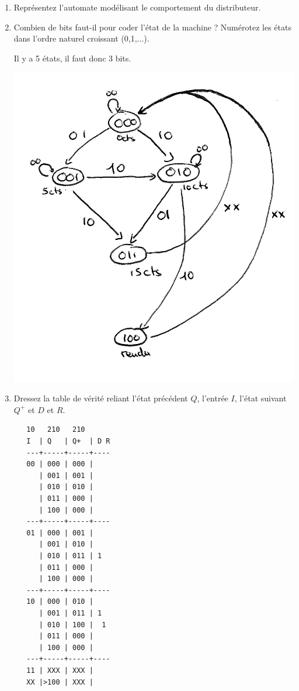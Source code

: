 \documentclass[a4paper,10pt]{exam}
\begin{document}
\begin{enumerate}
  \item Représentez l'automate modélisant le comportement du distributeur.
  \item Combien de bits faut-il pour coder l'état de la machine ? Numérotez
    les états dans l'ordre naturel croissant (0,1,$\dots$).

    \begin{solution}
      Il y a 5 états, il faut donc 3 bits.

      \includegraphics{TD9-transitions}
    \end{solution}

  \item Dressez la table de vérité reliant l'état précédent $Q$,
    l'entrée $I$,  l'état suivant $Q^{+}$ et $D$ et $R$.

    \begin{solution}
\begin{verbatim}
   10   210   210
   I  | Q   | Q+  | D R
   ---+-----+-----+----
   00 | 000 | 000 |
      | 001 | 001 |
      | 010 | 010 |
      | 011 | 000 |
      | 100 | 000 |
   ---+-----+-----+----
   01 | 000 | 001 |
      | 001 | 010 |
      | 010 | 011 | 1
      | 011 | 000 |
      | 100 | 000 |
   ---+-----+-----+----
   10 | 000 | 010 |
      | 001 | 011 | 1
      | 010 | 100 |  1
      | 011 | 000 |
      | 100 | 000 |
   ---+-----+-----+----
   11 | XXX | XXX |
   XX |>100 | XXX |
\end{verbatim}


\end{solution}
\end{enumerate}
\end{document}
